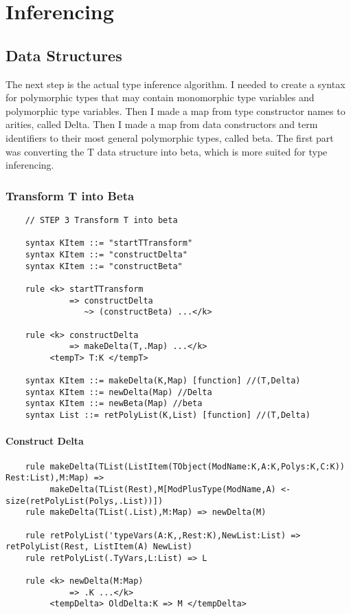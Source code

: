\chapter{Inferencing}
\section{Data Structures}
The next step is the actual type inference algorithm.
	I needed to create a syntax for polymorphic types that may contain monomorphic type variables and polymorphic type variables.
	Then I made a map from type constructor names to arities, called Delta.
	Then I made a map from data constructors and term identifiers to their most general polymorphic types, called beta.
	The first part was converting the T data structure into beta, which is more suited for type inferencing.
\subsection{Transform T into Beta}
\begin{lstlisting}
    // STEP 3 Transform T into beta

    syntax KItem ::= "startTTransform"
    syntax KItem ::= "constructDelta"
    syntax KItem ::= "constructBeta"

    rule <k> startTTransform
             => constructDelta
                ~> (constructBeta) ...</k>

    rule <k> constructDelta
             => makeDelta(T,.Map) ...</k>
         <tempT> T:K </tempT>

    syntax KItem ::= makeDelta(K,Map) [function] //(T,Delta)
    syntax KItem ::= newDelta(Map) //Delta
    syntax KItem ::= newBeta(Map) //beta
    syntax List ::= retPolyList(K,List) [function] //(T,Delta)
\end{lstlisting}

\subsubsection{Construct Delta}
\begin{lstlisting}
    rule makeDelta(TList(ListItem(TObject(ModName:K,A:K,Polys:K,C:K)) Rest:List),M:Map) =>
         makeDelta(TList(Rest),M[ModPlusType(ModName,A) <- size(retPolyList(Polys,.List))])
    rule makeDelta(TList(.List),M:Map) => newDelta(M)

    rule retPolyList('typeVars(A:K,,Rest:K),NewList:List) => retPolyList(Rest, ListItem(A) NewList)
    rule retPolyList(.TyVars,L:List) => L

    rule <k> newDelta(M:Map)
             => .K ...</k>
         <tempDelta> OldDelta:K => M </tempDelta>

\end{lstlisting}


